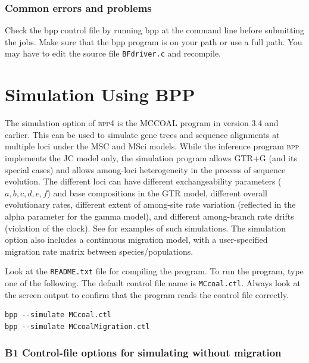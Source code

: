 \documentclass{book}
\numberwithin{equation}{section} \renewcommand{\baselinestretch}{0.55}
\begin{document}
\subsection{Common errors and problems}

Check the bpp control file by running bpp at the command line before
submitting the jobs.  Make sure that the bpp program is on your path
or use a full path.  You may have to edit the source file
\texttt{BFdriver.c} and recompile.


\chapter{Simulation Using BPP}

The simulation option of \textsc{bpp4} is the MCCOAL program in
version 3.4 and earlier.  This can be used to simulate gene trees and
sequence alignments at multiple loci under the MSC \citep{Rannala2003}
and MSci \citep{Flouri2020a} models.  While the inference program
\textsc{bpp} implements the JC model only, the simulation program
allows GTR+G (and its special cases) and allows among-loci
heterogeneity in the process of sequence evolution.  The different
loci can have different exchangeability parameters
($a, b, c, d, e, f$) and base compositions in the GTR model, different
overall evolutionary rates, different extent of among-site rate
variation (reflected in the alpha parameter for the gamma model), and
different among-branch rate drifts (violation of the clock).  See
\citet{Shi2018} for examples of such simulations.  The simulation
option also includes a continuous migration model, with a
user-specified migration rate matrix between species/populations.

Look at the \texttt{README.txt} file for compiling the program.  To
run the program, type one of the following.  The default control file
name is \texttt{MCcoal.ctl}.  Always look at the screen output to
confirm that the program reads the control file correctly.
\begin{verbatim}
bpp --simulate MCcoal.ctl
bpp --simulate MCcoalMigration.ctl
\end{verbatim}


\subsection{B1 Control-file options for simulating without migration}
\end{document}
